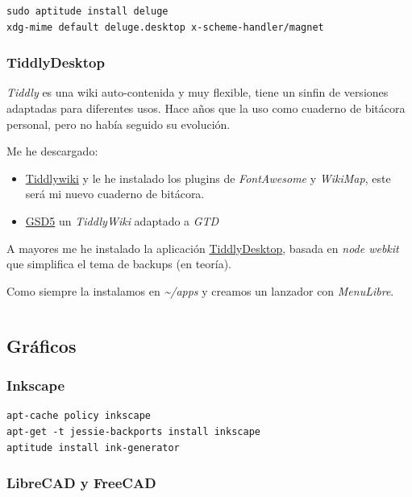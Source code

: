 \documentclass[12pt,spanish,]{scrartcl}
\providecommand{\tightlist}{%
  \setlength{\itemsep}{0pt}\setlength{\parskip}{0pt}}
\begin{document}
\begin{verbatim}
sudo aptitude install deluge
xdg-mime default deluge.desktop x-scheme-handler/magnet
\end{verbatim}

\subsubsection{TiddlyDesktop}\label{tiddlydesktop}

\emph{Tiddly} es una wiki auto-contenida y muy flexible, tiene un sinfin
de versiones adaptadas para diferentes usos. Hace años que la uso como
cuaderno de bitácora personal, pero no había seguido su evolución.

Me he descargado:

\begin{itemize}
\tightlist
\item
  \href{http://tiddlywiki.com/}{Tiddlywiki} y le he instalado los
  plugins de \emph{FontAwesome} y \emph{WikiMap}, este será mi nuevo
  cuaderno de bitácora.
\item
  \href{http://gsd5.tiddlyspot.com/}{GSD5} un \emph{TiddlyWiki} adaptado
  a \emph{GTD}
\end{itemize}

A mayores me he instalado la aplicación
\href{https://github.com/Jermolene/TiddlyDesktop}{TiddlyDesktop}, basada
en \emph{node webkit} que simplifica el tema de backups (en teoría).

Como siempre la instalamos en \emph{\textasciitilde{}/apps} y creamos un
lanzador con \emph{MenuLibre}.

\begin{verbatim}
\end{verbatim}

\subsection{Gráficos}\label{gruxe1ficos}

\subsubsection{Inkscape}\label{inkscape}

\begin{verbatim}
apt-cache policy inkscape
apt-get -t jessie-backports install inkscape
aptitude install ink-generator
\end{verbatim}

\subsubsection{LibreCAD y FreeCAD}\label{librecad-y-freecad}
\end{document}
